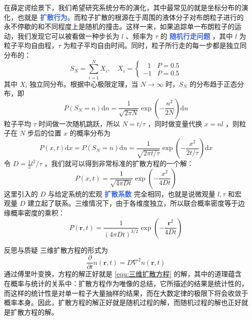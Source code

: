 在薛定谔绘景下，我们希望研究系统分布的演化，其中最常见的就是坐标分布的演化，也就是 \textcolor{RoyalBlue}{\textbf{\kaishu 扩散行为}}。而粒子扩散的根源在于周围的液体分子对布朗粒子进行的永不停歇的和不同程度上是随机的撞击。这样一来，如果追踪单一布朗粒子的运动，我们发现它可以被看做一种步长为 $l$ 、频率为 $\tau$ 的 \textcolor{RoyalBlue}{\textbf{\kaishu 随机行走问题}} ，其中 $l$ 为粒子平均自由程，$\tau$ 为粒子平均自由时间。同时，粒子所行走的每一步都是独立同分布的：
\begin{equation}\label{equ:S_N}
    S_N = \sum_{i=1}^N X_i,\quad X_i = \left\{\begin{array}{lll}
        ~~~1 & P = 0.5 \\
        -1& P = 0.5
        \end{array}\right.
\end{equation}
其中 $X_i$ 独立同分布。根据中心极限定理，当 $N\rightarrow \infty$ 时，$S_N$ 的分布趋于正态分布，即
\begin{equation}\label{equ:S_N的分布}
    P(S_N = n)\mathrm{d}n = \frac{1}{\sqrt{2\pi N}}\exp\left(-\frac{n^2}{2N}\right) \mathrm{d}n
\end{equation}
粒子平均 $\tau$  时间做一次随机跳跃，所以 $N = t / \tau$ ，同时做变量代换 $x = nl$ ，则粒子在 $N$ 步后的位置 $x$ 的概率分布为
\begin{equation}\label{equ:布朗运动的概率分布}
    P(x,t)\mathrm{d}x = P(S_N = n)\mathrm{d}n = \frac{1}{\sqrt{2\pi t / \tau}}\exp\left(-\frac{x^2}{2t / \tau}\right) \mathrm{d}x
\end{equation}
令 $D = \frac{1}{2} l^2/\tau$ ，我们就可以得到非常标准的扩散方程的一个解：
\begin{equation}\label{equ:扩散方程的解}
    P(x,t) = \frac{1}{\sqrt{4\pi Dt}}\exp\left(-\frac{x^2}{4Dt}\right)
\end{equation}
这里引入的 $D$ 与给定系统的宏观 \textcolor{RoyalBlue}{\textbf{\kaishu 扩散系数}} 完全相同，也就是说微观量 $l,\tau$ 和宏观量 $D$ 建立起了联系。三维情况下，由于各维度独立，所以联合概率密度等于边缘概率密度的乘积：
\begin{equation}\label{equ:三维扩散方程}
    P(\bm{r},t) = \frac{1}{(4\pi Dt)^{3/2}}\exp\left(-\frac{\bm{r}^2}{4Dt}\right)
\end{equation}
\begin{justification}{反思与质疑}
\kaishu \fontsize{11pt}{16pt}
    \quad\quad  三维扩散方程的形式为
    \[
        \frac{\partial }{\partial t}n(\bm r, t) = D\nabla^2 n(\bm r, t)
    \]
    通过傅里叶变换，方程的解正好就是 \eqref{equ:三维扩散方程} 的解，其中的道理蕴含在概率与统计的关系中：扩散方程作为唯像的总结，它所描述的结果是统计性的，而这样的统计性是对单一粒子大量抽样的结果，而在大数定律的极限下将会收敛于概率本身。因此，扩散方程的解正好就是随机过程的解，而随机过程的解也正好就是扩散方程的解。
\end{justification}

